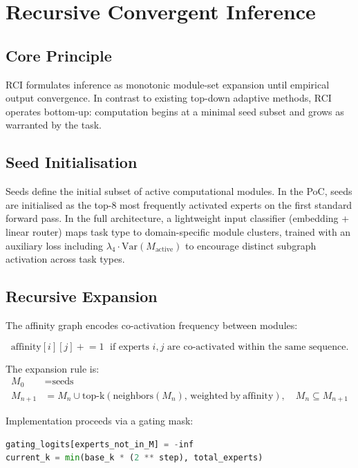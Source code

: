 \documentclass{article}
\begin{document}
\section{Recursive Convergent Inference}
\label{sec:method}

\subsection{Core Principle}

RCI formulates inference as monotonic module-set expansion until
empirical output convergence.
In contrast to existing top-down adaptive methods, RCI operates
bottom-up: computation begins at a minimal seed subset and grows
as warranted by the task.

\subsection{Seed Initialisation}

Seeds define the initial subset of active computational modules.
In the PoC, seeds are initialised as the top-8 most frequently
activated experts on the first standard forward pass.
In the full architecture, a lightweight input classifier
(embedding + linear router) maps task type to domain-specific
module clusters, trained with an auxiliary loss including
$\lambda_4 \cdot \mathrm{Var}(M_{\mathrm{active}})$ to encourage
distinct subgraph activation across task types.

\subsection{Recursive Expansion}

The affinity graph encodes co-activation frequency between modules:

\[
\mathrm{affinity}[i][j] \mathrel{+}= 1
\;\text{ if experts } i,j
\text{ are co-activated within the same sequence.}
\]

The expansion rule is:
\begin{align}
M_0 &= \text{seeds} \\
M_{n+1} &= M_n \cup
\mathrm{top\text{-}k}\!\left(\mathrm{neighbors}(M_n),\,
\mathrm{weighted\ by\ affinity}\right),
\quad M_n \subseteq M_{n+1}
\end{align}

Implementation proceeds via a gating mask:
\begin{lstlisting}[language=Python]
gating_logits[experts_not_in_M] = -inf
current_k = min(base_k * (2 ** step), total_experts)
\end{lstlisting}
\end{document}
